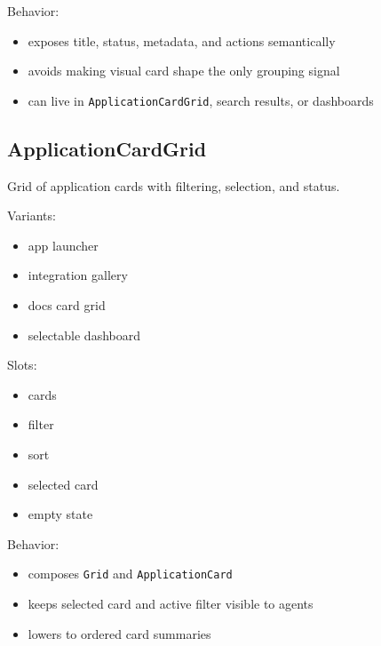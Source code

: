 Behavior:

\begin{itemize}
\tightlist
\item
  exposes title, status, metadata, and actions semantically
\item
  avoids making visual card shape the only grouping signal
\item
  can live in \texttt{A\allowbreak{}p\allowbreak{}p\allowbreak{}l\allowbreak{}i\allowbreak{}c\allowbreak{}a\allowbreak{}t\allowbreak{}i\allowbreak{}o\allowbreak{}n\allowbreak{}C\allowbreak{}a\allowbreak{}r\allowbreak{}d\allowbreak{}G\allowbreak{}r\allowbreak{}i\allowbreak{}d}, search results, or dashboards
\end{itemize}

\subsection{ApplicationCardGrid}\label{record-128-applicationcardgrid}

Grid of application cards with filtering, selection, and status.

Variants:

\begin{itemize}
\tightlist
\item
  app launcher
\item
  integration gallery
\item
  docs card grid
\item
  selectable dashboard
\end{itemize}

Slots:

\begin{itemize}
\tightlist
\item
  cards
\item
  filter
\item
  sort
\item
  selected card
\item
  empty state
\end{itemize}

Behavior:

\begin{itemize}
\tightlist
\item
  composes \texttt{G\allowbreak{}r\allowbreak{}i\allowbreak{}d} and \texttt{A\allowbreak{}p\allowbreak{}p\allowbreak{}l\allowbreak{}i\allowbreak{}c\allowbreak{}a\allowbreak{}t\allowbreak{}i\allowbreak{}o\allowbreak{}n\allowbreak{}C\allowbreak{}a\allowbreak{}r\allowbreak{}d}
\item
  keeps selected card and active filter visible to agents
\item
  lowers to ordered card summaries
\end{itemize}

